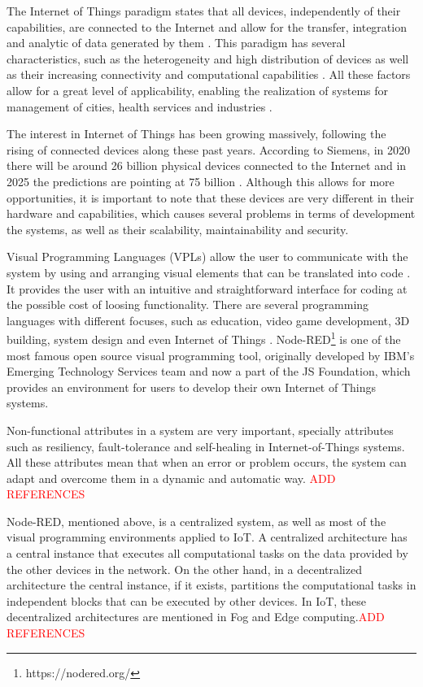 The Internet of Things paradigm states that all devices, independently of their capabilities, are connected to the Internet and allow for the transfer, integration and analytic of data generated by them \cite{IoT_principles_and_paradigms}. This paradigm has several characteristics, such as the heterogeneity and high distribution of devices as well as their increasing connectivity and computational capabilities \cite{SoS}. All these factors allow for a great level of applicability, enabling the realization of systems for management of cities, health services and industries \cite{6851114}.
\par The interest in Internet of Things has been growing massively, following the rising of connected devices along these past years. According to Siemens, in 2020 there will be around 26 billion physical devices connected to the Internet and in 2025 the predictions are pointing at 75 billion \cite{tanweer}. Although this allows for more opportunities, it is important to note that these devices are very different in their hardware and capabilities, which causes several problems in terms of development the systems, as well as their scalability, maintainability and security. 
\par Visual Programming Languages (VPLs) allow the user to communicate with the system by using and arranging visual elements that can be translated into code \cite{vpl-book}. It provides the user with an intuitive and straightforward interface for coding at the possible cost of loosing functionality. There are several programming languages with different focuses, such as education, video game development, 3D building, system design and even Internet of Things \cite{survey_vpl_iot}. Node-RED\footnote{https://nodered.org/} is one of the most famous open source visual programming tool, originally developed by IBM’s Emerging Technology Services team and now a part of the JS Foundation, which provides an environment for users to develop their own Internet of Things systems.
\par Non-functional attributes in a system are very important, specially attributes such as resiliency, fault-tolerance and self-healing in Internet-of-Things systems. All these attributes mean that when an error or problem occurs, the system can adapt and overcome them in a dynamic and automatic way. \textcolor{red}{ADD REFERENCES}
\par Node-RED, mentioned above, is a centralized system, as well as most of the visual programming environments applied to IoT. A centralized architecture has a central instance that executes all computational tasks on the data provided by the other devices in the network. On the other hand, in a decentralized architecture the central instance, if it exists, partitions the computational tasks in independent blocks that can be executed by other devices. In IoT, these decentralized architectures are mentioned in Fog and Edge computing.\textcolor{red}{ADD REFERENCES}

